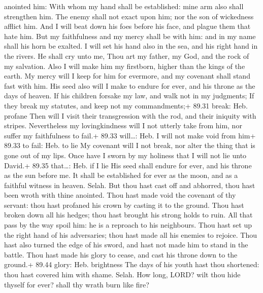 anointed him:  With whom my hand shall be established: mine
arm also shall strengthen him.  The enemy shall not exact
upon him; nor the son of wickedness afflict him.  And I
will beat down his foes before his face, and plague them that hate him.
 But my faithfulness and my mercy shall be with him: and in
my name shall his horn be exalted.  I will set his hand
also in the sea, and his right hand in the rivers.  He
shall cry unto me, Thou art my father, my God, and the rock of my
salvation.  Also I will make him my firstborn, higher than
the kings of the earth.  My mercy will I keep for him for
evermore, and my covenant shall stand fast with him.  His
seed also will I make to endure for ever, and his throne as the days of
heaven.  If his children forsake my law, and walk not in my
judgments;  If they break my statutes, and keep not my
commandments;+ 89.31 break: Heb. profane  Then will I visit
their transgression with the rod, and their iniquity with stripes.
 Nevertheless my lovingkindness will I not utterly take
from him, nor suffer my faithfulness to fail.+ 89.33 will\ldots: Heb. I
will not make void from him+ 89.33 to fail: Heb. to lie  My
covenant will I not break, nor alter the thing that is gone out of my
lips.  Once have I sworn by my holiness that I will not lie
unto David.+ 89.35 that\ldots: Heb. if I lie  His seed
shall endure for ever, and his throne as the sun before me.
 It shall be established for ever as the moon, and as a
faithful witness in heaven. Selah.  But thou hast cast off
and abhorred, thou hast been wroth with thine anointed. 
Thou hast made void the covenant of thy servant: thou hast profaned his
crown by casting it to the ground.  Thou hast broken down
all his hedges; thou hast brought his strong holds to ruin.
 All that pass by the way spoil him: he is a reproach to
his neighbours.  Thou hast set up the right hand of his
adversaries; thou hast made all his enemies to rejoice. 
Thou hast also turned the edge of his sword, and hast not made him to
stand in the battle.  Thou hast made his glory to cease,
and cast his throne down to the ground.+ 89.44 glory: Heb. brightness
 The days of his youth hast thou shortened: thou hast
covered him with shame. Selah.  How long, LORD? wilt thou
hide thyself for ever? shall thy wrath burn like fire? 
